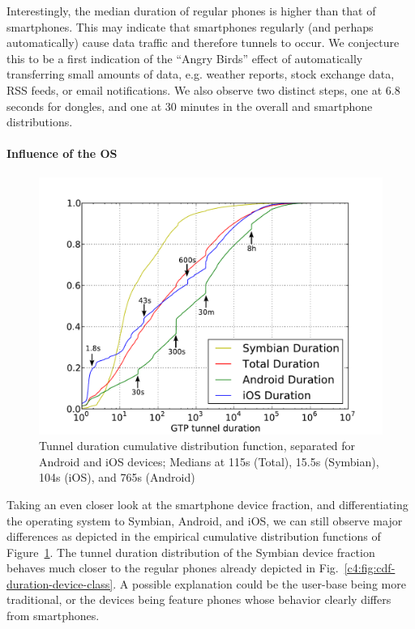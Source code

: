 Interestingly, the median duration of regular phones is higher than that of smartphones. This may indicate that smartphones regularly (and perhaps automatically) cause data traffic and therefore tunnels to occur. We conjecture this to be a first indication of the ``Angry Birds'' effect of automatically transferring small amounts of data, e.g. weather reports, stock exchange data, RSS feeds, or email notifications. We also observe two distinct steps, one at 6.8 seconds for dongles, and one at 30 minutes in the overall and smartphone distributions.


\paragraph{Influence of the \texorpdfstring{\acrshort{OS}}{OS}}

\begin{figure}[htb]
    \centering
    \includegraphics[width=1.0\textwidth]{images/tunnel-dur-os-cdf-mod.pdf}
    \caption{Tunnel duration cumulative distribution function, separated for Android and iOS devices; Medians at 115s (Total), 15.5s (Symbian), 104s (iOS), and 765s (Android)}
    \label{c4:fig:cdf-duration-os}
\end{figure}

Taking an even closer look at the smartphone device fraction, and differentiating the operating system to Symbian, Android, and iOS, we can still observe major differences as depicted in the empirical cumulative distribution functions of Figure~\ref{c4:fig:cdf-duration-os}. The tunnel duration distribution of the Symbian device fraction behaves much closer to the regular phones already depicted in Fig.~\ref{c4:fig:cdf-duration-device-class}. A possible explanation could be the user-base being more traditional, or the devices being feature phones whose behavior clearly differs from smartphones.

